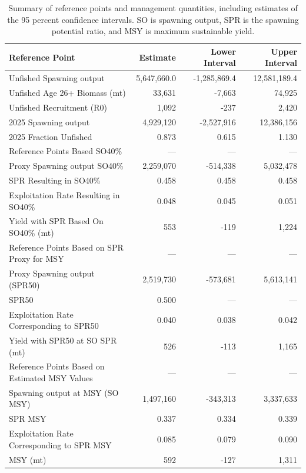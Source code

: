 \documentclass[
]{scrartcl}
\begin{document}
\begin{longtable}{lrrr}

\caption{\label{tbl-man-ref-points}Summary of reference points and
management quantities, including estimates of the 95 percent confidence
intervals. SO is spawning output, SPR is the spawning potential ratio,
and MSY is maximum sustainable yield.}

\tabularnewline

\toprule
Reference Point & Estimate & Lower Interval & Upper Interval \\ 
\midrule\addlinespace[2.5pt]
Unfished Spawning output & 5,647,660.0 & -1,285,869.4 & 12,581,189.4 \\ 
Unfished Age 26+ Biomass (mt) & 33,631 & -7,663 & 74,925 \\ 
Unfished Recruitment (R0) & 1,092 & -237 & 2,420 \\ 
2025 Spawning output & 4,929,120 & -2,527,916 & 12,386,156 \\ 
2025 Fraction Unfished & 0.873 & 0.615 & 1.130 \\ 
Reference Points Based SO40\% & — & — & — \\ 
Proxy Spawning output SO40\% & 2,259,070 & -514,338 & 5,032,478 \\ 
SPR Resulting in SO40\% & 0.458 & 0.458 & 0.458 \\ 
Exploitation Rate Resulting in SO40\% & 0.048 & 0.045 & 0.051 \\ 
Yield with SPR Based On SO40\% (mt) & 553 & -119 & 1,224 \\ 
Reference Points Based on SPR Proxy for MSY & — & — & — \\ 
Proxy Spawning output (SPR50) & 2,519,730 & -573,681 & 5,613,141 \\ 
SPR50 & 0.500 & — & — \\ 
Exploitation Rate Corresponding to SPR50 & 0.040 & 0.038 & 0.042 \\ 
Yield with SPR50 at SO SPR (mt) & 526 & -113 & 1,165 \\ 
Reference Points Based on Estimated MSY Values & — & — & — \\ 
Spawning output at MSY (SO MSY) & 1,497,160 & -343,313 & 3,337,633 \\ 
SPR MSY & 0.337 & 0.334 & 0.339 \\ 
Exploitation Rate Corresponding to SPR MSY & 0.085 & 0.079 & 0.090 \\ 
MSY (mt) & 592 & -127 & 1,311 \\ 
\bottomrule

\end{longtable}
\end{document}
